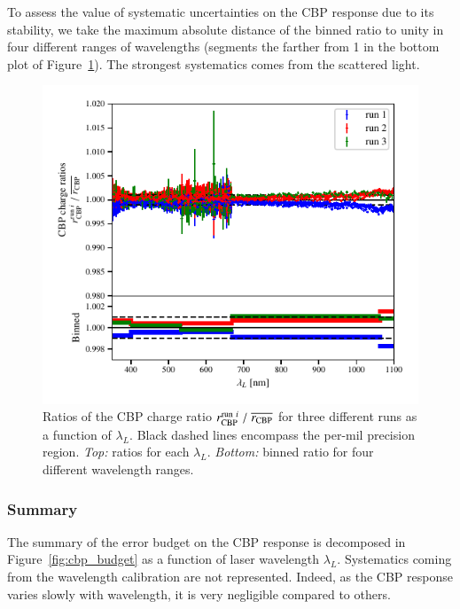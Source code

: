 To assess the value of systematic uncertainties on the CBP response due to its stability, we take the maximum absolute distance of the binned ratio to unity in four different ranges of wavelengths (segments the farther from 1 in the bottom plot of Figure~\ref{fig:SCrepeatability}). The strongest systematics comes from the scattered light.

\begin{figure}[h]
    \centering
    \includegraphics[width=\columnwidth]{fig/sc_runi_ratios.pdf}
    \caption{Ratios of the CBP charge ratio $r_{\rm CBP}^{\mathrm{run}\ i}\;/\;\overline{r_{\rm CBP}}$ for three different runs as a function of $\lambda_L$. Black dashed lines encompass the per-mil precision region. \textit{Top:} ratios for each $\lambda_L$. \textit{Bottom:} binned ratio for four different wavelength ranges.}
    \label{fig:SCrepeatability}
\end{figure}

\subsubsection{Summary}\label{sec:cbp_summary}

The summary of the error budget on the CBP response is decomposed in Figure~\ref{fig:cbp_budget} as a function of laser wavelength $\lambda_L$. Systematics coming from the wavelength calibration are not represented. Indeed, as the CBP response varies slowly with wavelength, it is very negligible compared to others. 

